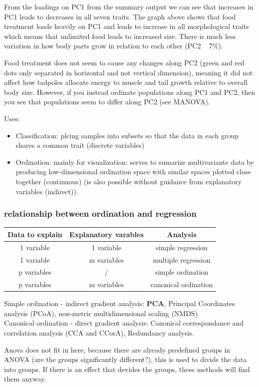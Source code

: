 \documentclass{article}
\begin{document}
From the loadings on PC1 from the summary output we can see that increases in PC1 leads to decreases in all seven traits. The graph above shows that food treatment loads heavily on PC1 and leads to increase in all morphological traits which means that unlimited food leads to increased size. There is much less variation in how body parts grow in relation to each other (PC2 ~ 7\%).\par 
Food treatment does not seem to cause any changes along PC2 (green and red dots only separated in horizontal and not vertical dimension), meaning it did not affect how tadpoles allocate energy to muscle and tail growth relative to overall body size. However, if you instead ordinate populations along PC1 and PC2, then you see that populations seem to differ along PC2 (see MANOVA). 

Uses:
\begin{itemize}
    \item Classification: plcing samples into subsets so that the data in each group shares a common trait (discrete variables)
    \item Ordination: mainly for visualization: serves to sumarize multivariante data by producing low-dimensional ordination space with similar spaces plotted close together (continuous) (is also possible without guidance from explanatory variables (indirect)).
\end{itemize}

\subsubsection{relationship between ordination and regression}
\renewcommand{\arraystretch}{1.5}
\begin{table}[h]
    \centering
    \begin{tabular}{c|c|c}
         \textbf{Data to explain} & \textbf{Explanatory varables} & \textbf{Analysis} \\
         \hline 
         1 variable & 1 variable & simple regression \\
         \hline
         1 variable & m variables & multiple regression \\
         \hline
         p variables & / & simple ordination \\
         \hline 
         p variables & m variables & canonical ordination 
    \end{tabular}
\end{table}
\renewcommand{\arraystretch}{1}

Simple ordination - indirect gradient analysis: \textbf{PCA}, Principal Coordinates analysis (PCoA), non-metric multidimensional scaling (NMDS)\\
Canonical ordination - direct gradient analysis: Canonical correspondance and correlation analysis (CCA and CCorA), Redundancy analysis.\par 
Anova does not fit in here, because there are already predefined groups in ANOVA (are the groups significantly different?), this is used to divide the data into groups. If there is an effect that devides the groups, these methods will find them anyway. 
\end{document}
